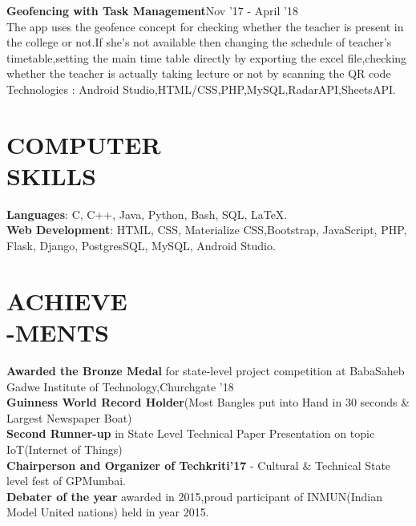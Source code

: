 \documentclass[margin]{res}
\begin{document}
\begin{resume}
\par
\textbf{Geofencing with Task Management}\hfill Nov '17 - April '18\\
The app uses the geofence concept for checking whether the teacher is present in the college or not.If she's not available then changing the schedule of teacher's timetable,setting the main time table directly by exporting the excel file,checking whether the teacher is actually taking lecture or not by scanning the QR code 
Technologies : Android Studio,HTML/CSS,PHP,MySQL,RadarAPI,SheetsAPI.

\section{COMPUTER\\SKILLS}

\textbf{Languages}: C, C++, Java, Python, Bash, SQL, LaTeX.
\\
\textbf{Web Development}: HTML, CSS, Materialize CSS,Bootstrap, JavaScript, PHP, Flask, Django, PostgresSQL, MySQL, Android Studio.
\\
\section{ACHIEVE\\-MENTS}
\textbf{Awarded the Bronze Medal} for state-level project competition at BabaSaheb Gadwe Institute of Technology,Churchgate ’18\\
\textbf {Guinness World Record Holder}(Most Bangles put into Hand in 30 seconds \& Largest Newspaper Boat)\\
\textbf{Second Runner-up} in State Level Technical Paper Presentation on topic IoT(Internet of Things) \\
\textbf {Chairperson and Organizer of Techkriti'17} - Cultural & Technical State level fest of GPMumbai.\\
\textbf {Debater of the year} awarded in 2015,proud participant of INMUN(Indian Model United nations) held in year 2015.


\end{resume}
\end{document}
